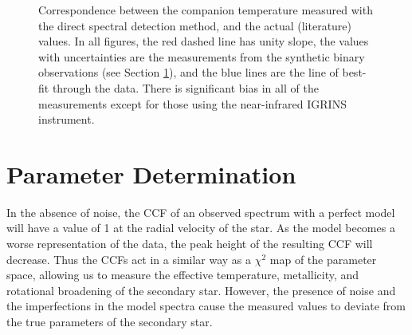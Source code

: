 \begin{figure}
{         }%
         \caption{Correspondence between the companion temperature measured with the direct spectral detection method, and the actual (literature) values. In all figures, the red dashed line has unity slope, the values with uncertainties are the measurements from the synthetic binary observations (see Section \ref{subpaper5_sec:systematics}), and the blue lines are the line of best-fit through the data. There is significant bias in all of the measurements except for those using the near-infrared IGRINS instrument.}
         \label{paper5_fig:error}
\end{figure}

\section{Parameter Determination}
\label{subpaper5_sec:systematics}



In the absence of noise, the CCF of an observed spectrum with a perfect model will have a value of 1 at the radial velocity of the star. As the model becomes a worse representation of the data, the peak height of the resulting CCF will decrease. Thus the CCFs act in a similar way as a $\chi^2$ map of the parameter space, allowing us to measure the effective temperature, metallicity, and rotational broadening of the secondary star. However, the presence of noise and the imperfections in the model spectra cause the measured values to deviate from the true parameters of the secondary star. 

